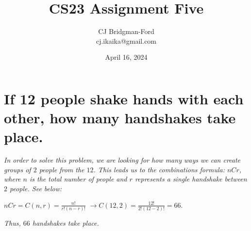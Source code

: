 \documentclass{article}
\title{CS23 Assignment Five}
\author{CJ Bridgman-Ford \\ cj.ikaika@gmail.com}
\date{April 16, 2024}
\begin{document}
\maketitle
\thispagestyle{empty}

\clearpage


\section{If 12 people shake hands with each other, how many
    handshakes take place.}
\hspace{1cm}\textit{In order to solve this problem, we are
    looking for how many ways we can create groups of $2$
    people from the $12$. This leads us to the combinations
    formula: $nCr$, where $n$ is the total number of people
    and $r$ represents a single handshake between $2$ people.
    See below:}
\begin{center}
    \large{$nCr = C(n,r) = \frac{n!}{r!(n-r)!}$}
    \large{$\xrightarrow{} C(12,2) = \frac{12!}{2!(12-2)!}
        = 66$.} \\
\end{center}
\hspace{1cm}\textit{Thus, $66$ handshakes take place.}

\end{document}
